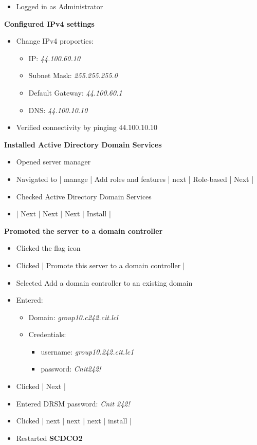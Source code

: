 \documentclass[letterpaper]{article}
\begin{document}
\begin{enumerate}
\begin{itemize}
\item Logged in as Administrator
\end{itemize}
\textbf{Configured IPv4 settings}
\begin{itemize}
\item Change IPv4 proporties:
\begin{itemize}
\item IP: \emph{44.100.60.10}
\item Subnet Mask: \emph{255.255.255.0}
\item Default Gateway: \emph{44.100.60.1}
\item DNS: \emph{44.100.10.10}
\end{itemize}
\item Verified connectivity by pinging 44.100.10.10
\end{itemize}
\textbf{Installed Active Directory Domain Services}
\begin{itemize}
\item Opened server manager
\item Navigated to | manage | Add roles and features | next | Role-based | Next |
\item Checked Active Directory Domain Services
\item | Next | Next | Next | Install |
\end{itemize}
\textbf{Promoted the server to a domain controller}
\begin{itemize}
\item Clicked the flag icon
\item Clicked | Promote this server to a domain controller |
\item Selected Add a domain controller to an existing domain
\item Entered:
\begin{itemize}
\item Domain: \emph{group10.c242.cit.lcl}
\item Credentials:
\begin{itemize}
\item username: \emph{group10.242.cit.lc1\Administrator}
\item password: \emph{Cnit242!}
\end{itemize}
\end{itemize}
\item Clicked | Next |
\item Entered DRSM password: \emph{Cnit 242!}
\item Clicked | next | next | next | install |
\item Restarted \textbf{SCDCO2}

\end{itemize}
\end{enumerate}
\end{document}

